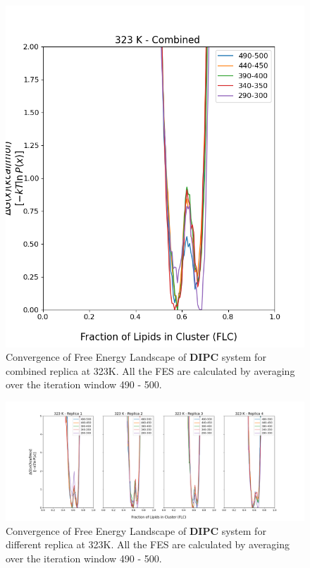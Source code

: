 \documentclass{biophys-new}
\begin{document}
\begin{figure}[hbt!]
\centering
\includegraphics[width=0.6\linewidth]{all_plots/ClusterLipids2Total/DPPC_DIPC_CHOL/323K/Convergence_DIPC_MULTI__323_ClusterLipids2Total.png}
\caption{Convergence of Free Energy Landscape of \textbf{DIPC} system for combined replica at 323K. All the FES are calculated by averaging over the iteration window 490 - 500.}
\label{fig:view}

\end{figure}

\begin{figure}[hbt!]
\centering
\includegraphics[width=1.1\linewidth]{all_plots/ClusterLipids2Total/DPPC_DIPC_CHOL/323K/Convergence_DIPC_323_ClusterLipids2Total.png}
\caption{Convergence of Free Energy Landscape of \textbf{DIPC} system for different replica at 323K. All the FES are calculated by averaging over the iteration window 490 - 500.}
\label{fig:view}

\end{figure}
\end{document}
